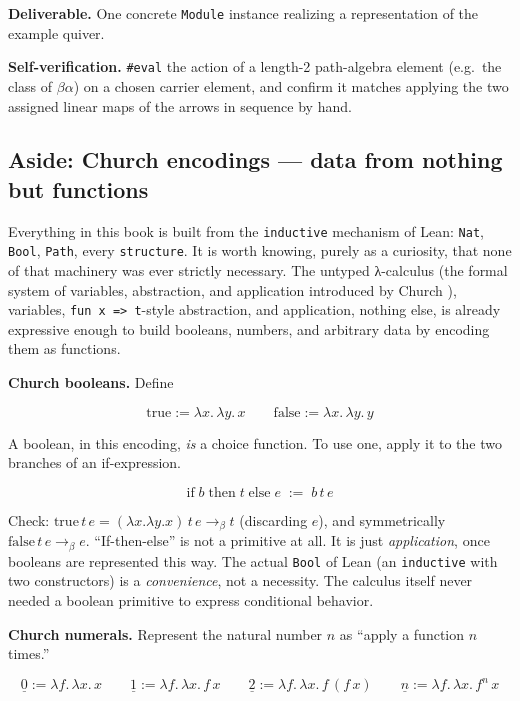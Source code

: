 \textbf{Deliverable.} One concrete \texttt{Module} instance realizing a representation of the example quiver.

\textbf{Self-verification.} \texttt{\#eval} the action of a length-2 path-algebra element (e.g.~the class of \(\beta\alpha\)) on a chosen carrier element, and confirm it matches applying the two assigned linear maps of the arrows in sequence by hand.

\subsection{Aside: Church encodings --- data from nothing but functions}\label{sec:14-next-steps:03-next-projects:7}

Everything in this book is built from the \texttt{inductive} mechanism of Lean: \texttt{Nat}, \texttt{Bool}, \texttt{Path}, every \texttt{structure}. It is worth knowing, purely as a curiosity, that none of that machinery was ever strictly necessary. The untyped λ-calculus (the formal system of variables, abstraction, and application introduced by Church \cite{Church1941}), variables, \texttt{fun x => t}-style abstraction, and application, nothing else, is already expressive enough to build booleans, numbers, and arbitrary data by encoding them as functions.

\textbf{Church booleans.} Define

\[
\mathrm{true} := \lambda x.\, \lambda y.\, x
\qquad
\mathrm{false} := \lambda x.\, \lambda y.\, y
\]

A boolean, in this encoding, \emph{is} a choice function. To use one, apply it to the two branches of an if-expression.

\[
\mathrm{if}\; b \;\mathrm{then}\; t \;\mathrm{else}\; e \;:=\; b\, t\, e
\]

Check: \(\mathrm{true}\, t\, e = (\lambda x.\lambda y. x)\, t\, e
\longrightarrow_\beta t\) (discarding \(e\)), and symmetrically \(\mathrm{false}\, t\, e \longrightarrow_\beta e\). ``If-then-else'' is not a primitive at all. It is just \emph{application}, once booleans are represented this way. The actual \texttt{Bool} of Lean (an \texttt{inductive} with two constructors) is a \emph{convenience}, not a necessity. The calculus itself never needed a boolean primitive to express conditional behavior.

\textbf{Church numerals.} Represent the natural number \(n\) as ``apply a function \(n\) times.''

\[
\underline{0} := \lambda f.\, \lambda x.\, x
\qquad
\underline{1} := \lambda f.\, \lambda x.\, f\, x
\qquad
\underline{2} := \lambda f.\, \lambda x.\, f\,(f\, x)
\qquad
\underline{n} := \lambda f.\, \lambda x.\, f^n\, x
\]

